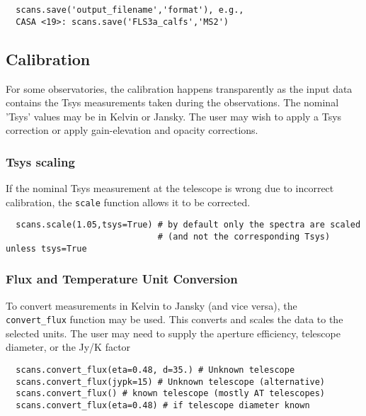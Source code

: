 \small
\begin{verbatim}
  scans.save('output_filename','format'), e.g.,
  CASA <19>: scans.save('FLS3a_calfs','MS2')
\end{verbatim}
\normalsize

\subsection{Calibration}
\label{subsection:sd.asap.calib}

For some observatories, the calibration happens transparently as the
input data contains the Tsys measurements taken during the
observations. The nominal 'Tsys' values may be in Kelvin or
Jansky. The user may wish to apply a Tsys correction or apply
gain-elevation and opacity corrections.

\subsubsection{Tsys scaling}
\label{subsubsection:sd.asap.calib.tsys}

If the nominal Tsys measurement at the telescope is wrong due to
incorrect calibration, the {\tt scale} function allows it to be corrected.  

\small
\begin{verbatim}
  scans.scale(1.05,tsys=True) # by default only the spectra are scaled
                              # (and not the corresponding Tsys) unless tsys=True
\end{verbatim}
\normalsize


\subsubsection{Flux and Temperature Unit Conversion}
\label{subsubsection:sd.asap.calib.fluxunit}

To convert measurements in Kelvin to Jansky (and vice versa), the {\tt
convert\_flux} function may be used. This converts and scales the data
to the selected units. The user may need to supply the aperture
efficiency, telescope diameter, or the Jy/K factor

\small
\begin{verbatim}
  scans.convert_flux(eta=0.48, d=35.) # Unknown telescope
  scans.convert_flux(jypk=15) # Unknown telescope (alternative)
  scans.convert_flux() # known telescope (mostly AT telescopes)
  scans.convert_flux(eta=0.48) # if telescope diameter known
\end{verbatim}
\normalsize

